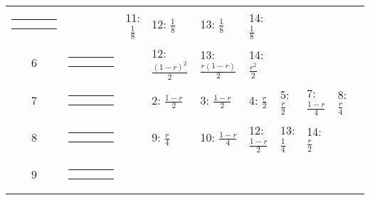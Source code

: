 \begin{center}
\begin{tabular}{ccclllllll}
{\parbox[b][3mm][c]{12mm}{
\begin{tabular}{|p{2mm}|p{2mm}||p{2mm}|p{2mm}|} \hline
$\bullet$ &           & $\circ  $ &           \\
          & $\bullet$ &           & $\circ  $ \\ \hline
\end{tabular}}}
&
& 11: $\frac{1}{8}$
& 12: $\frac{1}{8}$
& 13: $\frac{1}{8}$
& 14: $\frac{1}{8}$
& & & \\
6 &
{\renewcommand{\arraystretch}{0.3}
\renewcommand{\tabcolsep}{0.5mm}
\parbox[b][3mm][c]{12mm}{
\begin{tabular}{|p{2mm}|p{2mm}||p{2mm}|p{2mm}|} \hline
$\bullet$ & $\circ  $ &           &           \\
$\circ  $ & $\bullet$ &           &           \\ \hline
\end{tabular}}}
&
& 12: $\frac{(1-r)^2}{2}$
& 13: $\frac{r(1-r)}{2}$
& 14: $\frac{r^2}{2}$
& & & & \\
7 &
{\renewcommand{\arraystretch}{0.3}
\renewcommand{\tabcolsep}{0.5mm}
\parbox[b][3mm][c]{12mm}{
\begin{tabular}{|p{2mm}|p{2mm}||p{2mm}|p{2mm}|} \hline
$\bullet$ & $\circ  $ &           &           \\
$\bullet$ &           & $\circ  $ &           \\ \hline
\end{tabular}}}
&
& 2: $\frac{1-r}{2}$
& 3: $\frac{1-r}{2}$
& 4: $\frac{r}{2}$
& 5: $\frac{r}{2}$
& 7: $\frac{1-r}{4}$
& 8: $\frac{r}{4}$
& \\
8 &
{\renewcommand{\arraystretch}{0.3}
\renewcommand{\tabcolsep}{0.5mm}
\parbox[b][3mm][c]{12mm}{
\begin{tabular}{|p{2mm}|p{2mm}||p{2mm}|p{2mm}|} \hline
$\bullet$ &           & $\circ  $ &           \\
$\circ  $ & $\bullet$ &           &           \\ \hline
\end{tabular}}}
&
& 9: $\frac{r}{4}$
& 10: $\frac{1-r}{4}$
& 12: $\frac{1-r}{2}$
& 13: $\frac{1}{4}$
& 14: $\frac{r}{2}$
& & \\
9 &
{\renewcommand{\arraystretch}{0.3}
\renewcommand{\tabcolsep}{0.5mm}
\parbox[b][3mm][c]{12mm}{
\begin{tabular}{|p{2mm}|p{2mm}||p{2mm}|p{2mm}|} \hline
$\bullet$ & $\circ  $ &           &           \\
          & $\circ  $ & $\bullet$ &           \\ \hline

\end{tabular}}}
\end{tabular}
\end{center}
